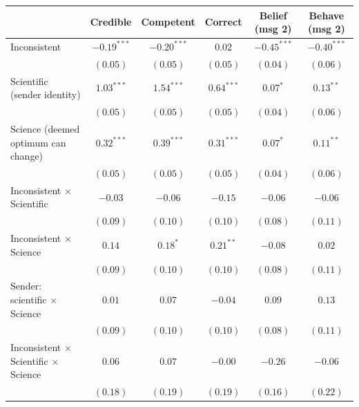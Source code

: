 
\begin{table}
\begin{center}
\begin{tabular}{l c c c c c}
\hline
 & Credible & Competent & Correct & Belief (msg 2) & Behave (msg 2) \\
\hline
Inconsistent                                      & $-0.19^{***}$ & $-0.20^{***}$ & $0.02$       & $-0.45^{***}$ & $-0.40^{***}$ \\
                                                  & $(0.05)$      & $(0.05)$      & $(0.05)$     & $(0.04)$      & $(0.06)$      \\
Scientific (sender identity)                      & $1.03^{***}$  & $1.54^{***}$  & $0.64^{***}$ & $0.07^{*}$    & $0.13^{**}$   \\
                                                  & $(0.05)$      & $(0.05)$      & $(0.05)$     & $(0.04)$      & $(0.06)$      \\
Science (deemed optimum can change)               & $0.32^{***}$  & $0.39^{***}$  & $0.31^{***}$ & $0.07^{*}$    & $0.11^{**}$   \\
                                                  & $(0.05)$      & $(0.05)$      & $(0.05)$     & $(0.04)$      & $(0.06)$      \\
Inconsistent $\times$ Scientific                  & $-0.03$       & $-0.06$       & $-0.15$      & $-0.06$       & $-0.06$       \\
                                                  & $(0.09)$      & $(0.10)$      & $(0.10)$     & $(0.08)$      & $(0.11)$      \\
Inconsistent $\times$ Science                     & $0.14$        & $0.18^{*}$    & $0.21^{**}$  & $-0.08$       & $0.02$        \\
                                                  & $(0.09)$      & $(0.10)$      & $(0.10)$     & $(0.08)$      & $(0.11)$      \\
Sender: scientific $\times$ Science               & $0.01$        & $0.07$        & $-0.04$      & $0.09$        & $0.13$        \\
                                                  & $(0.09)$      & $(0.10)$      & $(0.10)$     & $(0.08)$      & $(0.11)$      \\
Inconsistent $\times$ Scientific $\times$ Science & $0.06$        & $0.07$        & $-0.00$      & $-0.26$       & $-0.06$       \\
                                                  & $(0.18)$      & $(0.19)$      & $(0.19)$     & $(0.16)$      & $(0.22)$      \\

\end{tabular}
\end{center}
\end{table}
